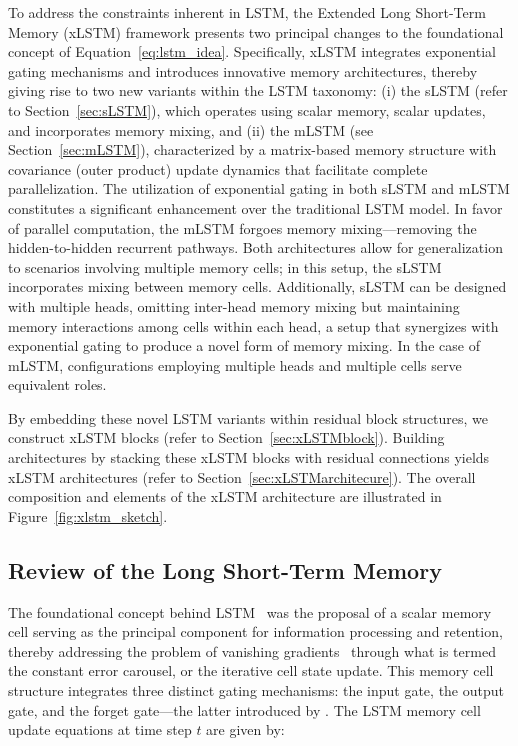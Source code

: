 To address the constraints inherent in LSTM, the Extended Long Short-Term Memory (xLSTM) framework presents two principal changes to the foundational concept of Equation~\eqref{eq:lstm_idea}. Specifically, xLSTM integrates exponential gating mechanisms and introduces innovative memory architectures, thereby giving rise to two new variants within the LSTM taxonomy: (i) the sLSTM (refer to Section~\ref{sec:sLSTM}), which operates using scalar memory, scalar updates, and incorporates memory mixing, and (ii) the mLSTM (see Section~\ref{sec:mLSTM}), characterized by a matrix-based memory structure with covariance (outer product) update dynamics that facilitate complete parallelization. The utilization of exponential gating in both sLSTM and mLSTM constitutes a significant enhancement over the traditional LSTM model. In favor of parallel computation, the mLSTM forgoes memory mixing—removing the hidden-to-hidden recurrent pathways. Both architectures allow for generalization to scenarios involving multiple memory cells; in this setup, the sLSTM incorporates mixing between memory cells. Additionally, sLSTM can be designed with multiple heads, omitting inter-head memory mixing but maintaining memory interactions among cells within each head, a setup that synergizes with exponential gating to produce a novel form of memory mixing. In the case of mLSTM, configurations employing multiple heads and multiple cells serve equivalent roles.

By embedding these novel LSTM variants within residual block structures, we construct xLSTM blocks (refer to Section~\ref{sec:xLSTMblock}). Building architectures by stacking these xLSTM blocks with residual connections yields xLSTM architectures (refer to Section~\ref{sec:xLSTMarchitecure}). The overall composition and elements of the xLSTM architecture are illustrated in Figure~\ref{fig:xlstm_sketch}.

\subsection{Review of the Long Short-Term Memory}
\label{sec:orgLSTM}

The foundational concept behind LSTM~\citep{Hochreiter:91,Hochreiter:97nips,Hochreiter:97} was the proposal of a scalar memory cell serving as the principal component for information processing and retention, thereby addressing the problem of vanishing gradients~\citep{Hochreiter:91,Hochreiter:00book} through what is termed the constant error carousel, or the iterative cell state update. This memory cell structure integrates three distinct gating mechanisms: the input gate, the output gate, and the forget gate—the latter introduced by \citet{Gers:00}. The LSTM memory cell update equations at time step $t$ are given by:

